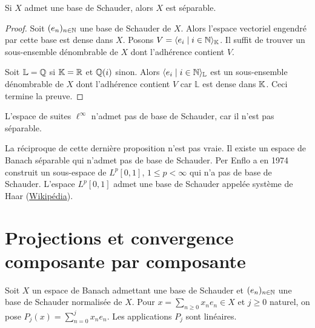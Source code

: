 \begin{prop}
  Si $X$ admet une base de Schauder, alors $X$ est séparable.
\end{prop}
\begin{proof}
  Soit $(e_n)_{n\in\mathbb{N}}$ une base de Schauder de $X$. Alors l'espace
  vectoriel engendré par cette base est dense dans $X$. Posons
  $V = \langle e_i \mid i\in\mathbb{N}\rangle_{\mathbb{K}}$. Il suffit de trouver
  un sous-ensemble dénombrable de $X$ dont l'adhérence contient $V$.

  Soit $\mathbb L = \mathbb{Q}$ si $\mathbb{K} = \mathbb{R}$ et $\mathbb{Q}(i)$ sinon. Alors
  $\langle e_i \mid i\in\mathbb{N}\rangle_\mathbb{L}$ est un sous-ensemble
  dénombrable de $X$ dont l'adhérence contient $V$ car $\mathbb L$ est
  dense dans $\mathbb{K}$. Ceci termine la preuve.
\end{proof}
\begin{ex}
  L'espace de suites $\ell^\infty$ n'admet pas de base de Schauder, car
  il n'est pas séparable.
\end{ex}

La réciproque de cette dernière proposition n'est pas vraie. Il existe un espace
de Banach séparable qui n'admet pas de base de Schauder. Per Enflo a en
1974 construit un sous-espace de $L^p[0, 1]$, $1\leq p < \infty$ qui
n'a pas de base de Schauder. L'espace $L^p[0, 1]$ admet une base de Schauder
appelée système de Haar
(\href{https://fr.wikipedia.org/wiki/Ondelette_de_Haar#Le_syst\%C3%
  \%A8me_de_Haar}{Wikipédia}).

\section{Projections et convergence composante par composante}
Soit $X$ un espace de Banach admettant une base de Schauder et $(e_n)_{n\in\mathbb{N}}$
une base de Schauder normalisée de $X$.
Pour $x = \sum_{n\geq 0}x_ne_n\in X$ et $j\geq 0$ naturel, on pose
$P_j(x)=\sum_{n=0}^jx_ne_n$. Les applications $P_j$ sont linéaires.

